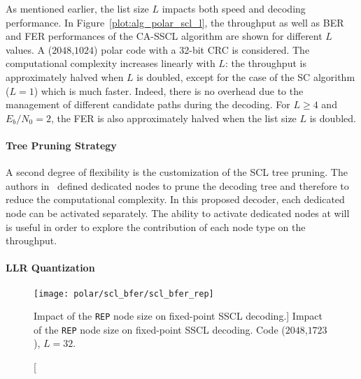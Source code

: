 As mentioned earlier, the list size $L$ impacts both speed and decoding
performance. In Figure~\ref{plot:alg_polar_scl_l}, the throughput as well as BER
and FER performances of the CA-SSCL algorithm are shown for different $L$
values. A ($2048$,$1024$) polar code with a 32-bit CRC is considered. The
computational complexity increases linearly with $L$: the throughput is
approximately halved when $L$ is doubled, except for the case of the SC
algorithm ($L=1$) which is much faster. Indeed, there is no overhead due to the
management of different candidate paths during the decoding. For $L\geq4$ and
$E_b/N_0=2$, the FER is also approximately halved when the list size $L$ is
doubled.

\paragraph{Tree Pruning Strategy}

A second degree of flexibility is the customization of the SCL tree pruning. The
authors in~\cite{Alamdar-Yazdi2011,Sarkis2016} defined dedicated nodes to prune
the decoding tree and therefore to reduce the computational complexity. In this
proposed decoder, each dedicated node can be activated separately. The ability
to activate dedicated nodes at will is useful in order to explore the
contribution of each node type on the throughput.

\paragraph{LLR Quantization}

\begin{figure}[htp]
  \centering
  \texttt{[image: polar/scl\_bfer/scl\_bfer\_rep]}
  \caption
    [Impact of the \texttt{REP} node size on fixed-point SSCL decoding.]
    {Impact of the \texttt{REP} node size on fixed-point SSCL decoding.
    Code ($2048$,$1723$), $L=32$.}
  \label{plot:alg_polar_scl_bfer_rep}
\end{figure}

